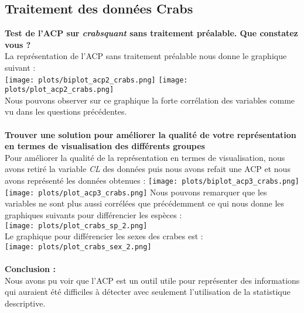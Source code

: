 \documentclass[a4paper, 10pt]{article}
\begin{document}
\subsection{Traitement des donn\'ees Crabs}
\textbf{Test de l'ACP sur \textit{crabsquant} sans traitement pr\'ealable. Que constatez vous ?}\\
La repr\'esentation de l'ACP sans traitement pr\'ealable nous donne le graphique suivant :\\
\texttt{[image: plots/biplot\_acp2\_crabs.png]}
\texttt{[image: plots/plot\_acp2\_crabs.png]}\\
Nous pouvons observer sur ce graphique la forte corr\'elation des variables comme vu dans les questions pr\'ec\'edentes.\\ \\
\textbf{Trouver une solution pour am\'eliorer la qualit\'e de votre repr\'esentation en termes de visualisation des diff\'erents groupes}\\
Pour am\'eliorer la qualit\'e de la repr\'esentation en termes de visualisation, nous avons retir\'e la variable \textit{CL}
des donn\'ees puis nous avons refait une ACP et nous avons repr\'esent\'e les donn\'ees obtenues :
\texttt{[image: plots/biplot\_acp3\_crabs.png]}
\texttt{[image: plots/plot\_acp3\_crabs.png]}\newpage
Nous pouvons remarquer que les variables ne sont plus aussi corr\'el\'ees que pr\'ec\'edemment ce qui nous donne les graphiques suivants
pour diff\'erencier les esp\`eces :\\
\texttt{[image: plots/plot\_crabs\_sp\_2.png]}\\
Le graphique pour diff\'erencier les sexes des crabes est :\\
\texttt{[image: plots/plot\_crabs\_sex\_2.png]}\\ \\
\textbf{Conclusion :}\\
Nous avons pu voir que l'ACP est un outil utile pour repr\'esenter des informations qui auraient \'et\'e difficiles \`a d\'etecter avec
seulement l'utilisation de la statistique descriptive.
\end{document}
